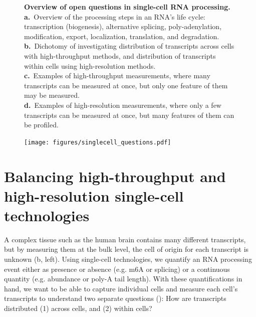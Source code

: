 \clearpage
\thispagestyle{facingcaption}
\begin{figure}[h]
\captionsetup{labelformat=prev-page}
\caption[Overview of open questions in single-cell RNA processing.]{\textbf{Overview of open questions in single-cell RNA processing.}\\
\textbf{a.}~Overview of the processing steps in an RNA's life cycle: transcription (biogenesis), alternative splicing, poly-adenylation, modification, export, localization, translation, and degradation.\\
\textbf{b.}~Dichotomy of investigating distribution of transcripts across cells with high-throughput methods, and distribution of transcripts within cells using high-resolution methods.\\
\textbf{c.}~Examples of high-throughput measurements, where many transcripts can be measured at once, but only one feature of them may be measured.\\
\textbf{d.}~Examples of high-resolution measurements, where only a few transcripts can be measured at once, but many features of them can be profiled.
}
\label{fig:singlecell_questions}
\end{figure}
\clearpage
\begin{figure}[h]
\ContinuedFloat
\captionsetup{labelformat=empty}
\centering
\texttt{[image: figures/singlecell\_questions.pdf]}
\end{figure}
\clearpage


\section{Balancing high-throughput and high-resolution single-cell technologies}

A complex tissue such as the human brain contains many different transcripts, but by measuring them at the bulk level, the cell of origin for each transcript is unknown (b, left). Using single-cell technologies, we quantify an RNA processing event either as presence or absence (e.g. m6A or splicing) or a continuous quantity (e.g. abundance or poly-A tail length). With these quantifications in hand, we want to be able to capture individual cells and measure each cell's transcripts to understand two separate questions (): How are transcripts distributed (1) across cells, and (2) within cells?

